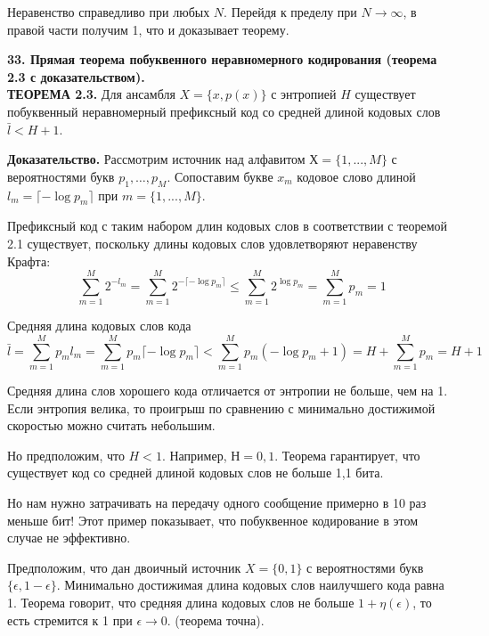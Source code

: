 \documentclass[14pt]{article}
\begin{document}
Неравенство справедливо при любых \(N\). Перейдя к пределу при \(N \to \infty\), в правой части получим 1, что и доказывает теорему.

\bigskip
\textbf{33. Прямая теорема побуквенного неравномерного кодирования (теорема 2.3 с доказательством).} \\

\textbf{ТЕОРЕМА 2.3.} Для ансамбля \(X = \{x,p(x)\}\) с энтропией \(H\) существует побуквенный неравномерный префиксный код со средней длиной кодовых слов \(\bar{l} < H + 1\).

\textbf{Доказательство.} Рассмотрим источник над алфавитом \(Х = \{1,...,M\}\) с вероятностями букв \(p_1,\ldots,p_M\). Сопоставим букве \(x_m\) кодовое слово длиной \(l_m = \lceil -\log p_m \rceil\) при \(m =\{1,...,M\}\).

Префиксный код с таким набором длин кодовых слов в соответствии с теоремой 2.1 существует, поскольку длины кодовых слов удовлетворяют неравенству Крафта:
\begin{displaymath}
    \sum_{m=1}^{M} 2^{-l_m} = \sum_{m=1}^{M} 2^{-\lceil -\log p_m \rceil} \leq \sum_{m=1}^{M} 2^{\log p_m} = \sum_{m=1}^{M} p_m = 1
\end{displaymath}

Средняя длина кодовых слов кода
\begin{displaymath}
    \bar{l} = \sum_{m=1}^{M} p_m l_m = \sum_{m=1}^{M} p_m \lceil -\log p_m \rceil < \sum_{m=1}^{M} p_m(-\log p_m + 1) = H + \sum_{m=1}^{M} p_m = H + 1
\end{displaymath}

Средняя длина слов хорошего кода отличается от энтропии не больше, чем на 1. Если энтропия велика, то проигрыш по сравнению с минимально достижимой скоростью можно считать небольшим.

Но предположим, что \(H < 1\). Например, \(Н = 0,1\). Теорема гарантирует, что существует код со средней длиной кодовых слов не больше 1,1 бита.

Но нам нужно затрачивать на передачу одного сообщение примерно в 10 раз меньше бит! Этот пример показывает, что побуквенное кодирование в этом случае не эффективно.

Предположим, что дан двоичный источник \(X = \{0,1\}\) с вероятностями букв \(\{\epsilon, 1 - \epsilon\}\). Минимально достижимая длина кодовых слов наилучшего кода равна 1. Теорема говорит, что средняя длина кодовых слов не больше \(1 + \eta(\epsilon)\), то есть стремится к 1 при \(\epsilon \to 0\). (теорема точна).
\end{document}
